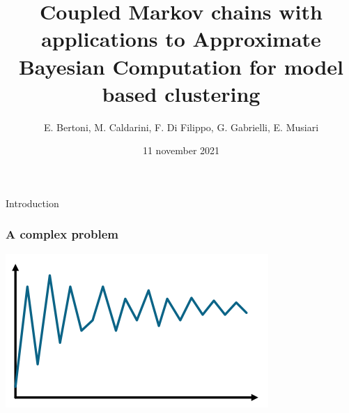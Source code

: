 \documentclass{beamer}
\title{Coupled Markov chains with applications to Approximate Bayesian Computation for model based clustering}
\author{E. Bertoni, M. Caldarini, F. Di Filippo, G. Gabrielli, E. Musiari}
\date{11 november 2021}
\begin{document}
\begin{frame}
\maketitle
\end{frame}

\begin{section}{Introduction}

	\begin{frame}
		\frametitle{A complex problem}

 		\begin{minipage}{0.45\textwidth}
 			\begin{center}
 				\includegraphics{img/markov_singola}
 			\end{center}
 		\end{minipage}
 		\hfill
 	 	\begin{minipage}{0.45\textwidth}
 	 		\begin{center}
 	 		\end{center}
 		\end{minipage}
 		

\end{frame}
\end{section}
\end{document}
